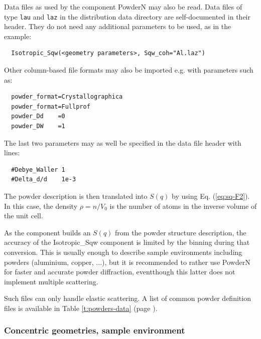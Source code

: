 Data files as used by the component PowderN may also be read. Data files of type \verb'lau' and \verb'laz' in the \MCS distribution data directory are self-documented in their header. They do not need any additional parameters to be used, as in the example:
\begin{lstlisting}
  Isotropic_Sqw(<geometry parameters>, Sqw_coh="Al.laz")
\end{lstlisting}
Other column-based file formats may also be imported e.g. with parameters such as:
\begin{lstlisting}
  powder_format=Crystallographica
  powder_format=Fullprof
  powder_Dd    =0
  powder_DW    =1
\end{lstlisting}
The last two parameters may as well be specified in the data file header with lines:
\begin{lstlisting}
  #Debye_Waller 1
  #Delta_d/d    1e-3
\end{lstlisting}
The powder description is then translated into $S(q)$ by using Eq. (\ref{eq:sq-F2}).
In this case, the density $\rho = n/V_0$ is the number of atoms in the inverse volume of the unit cell.

As the component builds an $S(q)$ from the powder structure description, the accuracy of the Isotropic\_Sqw component is limited by the binning during that conversion. This is usually enough to describe sample environments including powders (aluminium, copper, ...), but it is recommended to rather use PowderN for faster and accurate powder diffraction, eventthough this latter does not implement multiple scattering.

Such files can only handle elastic scattering. A list of common powder definition files is available in Table \ref{t:powders-data} (page \pageref{t:powders-data}).

\subsubsection{Concentric geometries, sample environment}

